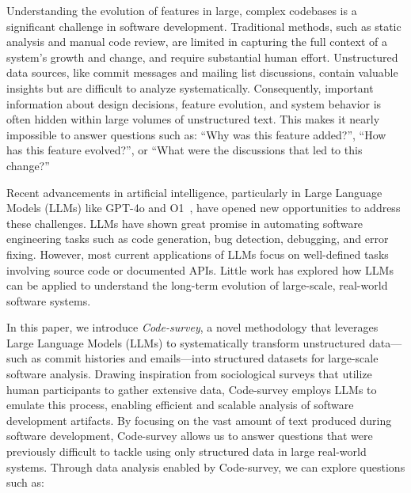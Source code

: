 \documentclass[sigconf,review,anonymous]{acmart}
\begin{document}
Understanding the evolution of features in large, complex codebases is a significant challenge in software development\cite{godfrey2008past,mens2008introduction}. Traditional methods, such as static analysis and manual code review, are limited in capturing the full context of a system's growth and change, and require substantial human effort. Unstructured data sources, like commit messages and mailing list discussions, contain valuable insights but are difficult to analyze systematically. Consequently, important information about design decisions, feature evolution, and system behavior is often hidden within large volumes of unstructured text. This makes it nearly impossible to answer questions such as: ``Why was this feature added?'', ``How has this feature evolved?'', or ``What were the discussions that led to this change?''

Recent advancements in artificial intelligence, particularly in Large Language Models (LLMs) like GPT-4o\cite{gpt4o} and O1~\cite{o1}, have opened new opportunities to address these challenges. LLMs have shown great promise in automating software engineering tasks such as code generation\cite{zheng2024kgent}, bug detection\cite{li2024enhancing}, debugging\cite{chen2023teaching}, and error fixing\cite{deligiannis2023fixing}. However, most current applications of LLMs focus on well-defined tasks involving source code or documented APIs. Little work has explored how LLMs can be applied to understand the long-term evolution of large-scale, real-world software systems.

In this paper, we introduce \emph{Code-survey}, a novel methodology that leverages Large Language Models (LLMs) to systematically transform unstructured data—such as commit histories and emails\cite{linux,tan2019communicate,schneider2016differentiating}—into structured datasets for large-scale software analysis. Drawing inspiration from sociological surveys that utilize human participants to gather extensive data, Code-survey employs LLMs to emulate this process, enabling efficient and scalable analysis of software development artifacts. By focusing on the vast amount of text produced during software development, Code-survey allows us to answer questions that were previously difficult to tackle using only structured data in large real-world systems. Through data analysis enabled by Code-survey, we can explore questions such as:
\end{document}
